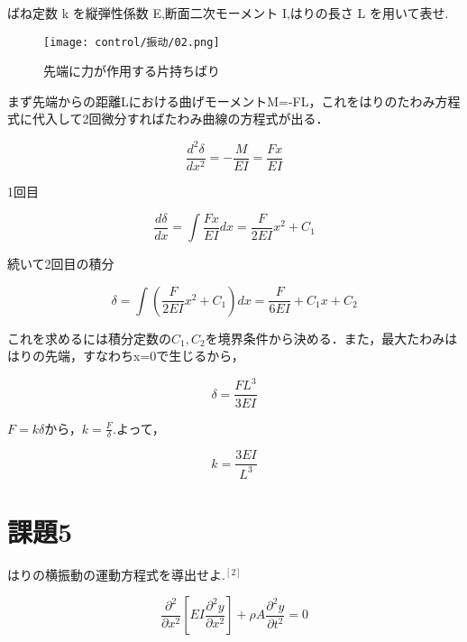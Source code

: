 \documentclass[xelatex,ja=standard,jafont=noto]{bxjsarticle}
\begin{document}
ばね定数 k を縦弾性係数 E,断面二次モーメント I,はりの長さ L を用いて表せ.



\begin{figure}[h!]
    \centering
    \texttt{[image: control/振动/02.png]}
    \caption{先端に力が作用する片持ちばり}
\end{figure}


まず先端からの距離Lにおける曲げモーメントM=-FL，これをはりのたわみ方程式に代入して2回微分すればたわみ曲線の方程式が出る．


\begin{equation}
		\frac{d^{2}\delta}{dx^{2}}=-\frac{M}{EI}=\frac{Fx}{EI}
\end{equation}

1回目

\begin{equation}
		\frac{d\delta}{dx}=\int\frac{Fx}{EI}dx=\frac{F}{2EI}x^{2}+C_{1}
\end{equation}

続いて2回目の積分


\begin{equation}
		\delta=\int(\frac{F}{2EI}x^{2}+C_{1})dx=\frac{F}{6EI}+C_{1}x+C_{2}
\end{equation}

これを求めるには積分定数の$ C_{1},C_{2} $を境界条件から決める．また，最大たわみははりの先端，すなわちx=0で生じるから，

\begin{equation}
	\delta=\frac{FL^{3}}{3EI}
\end{equation}


$ F=k\delta $から，$ k=\frac{F}{\delta} $.よって，



\begin{equation}
	k=\frac{3EI}{L^{3}}
\end{equation}



\newpage


\section{課題5}
はりの横振動の運動方程式を導出せよ.$ ^{[2]} $

\begin{equation}
			\frac{\partial^{2}}{\partial x^{2}}[EI\frac{\partial^{2}y}{\partial x^{2}}]+\rho A\frac{\partial^{2}y}{\partial t^{2}}=0
\end{equation}
\end{document}
